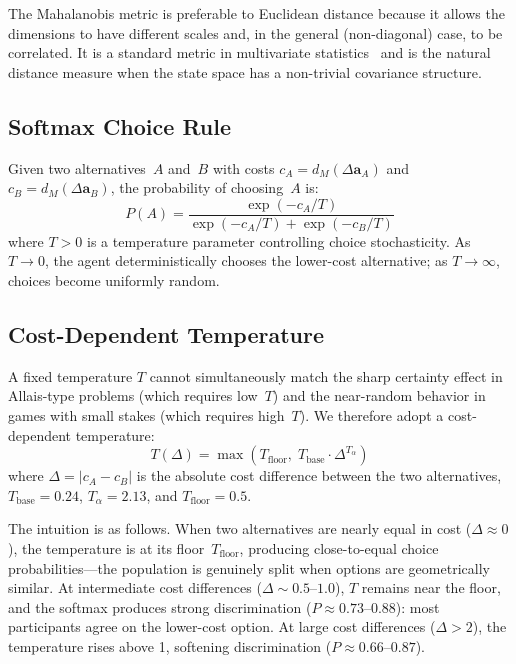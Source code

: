\documentclass[journal]{IEEEtran}
\begin{document}
The Mahalanobis metric is preferable to Euclidean distance because it allows the dimensions to have different scales and, in the general (non-diagonal) case, to be correlated.
It is a standard metric in multivariate statistics~\cite{mahalanobis1936} and is the natural distance measure when the state space has a non-trivial covariance structure.

\subsection{Softmax Choice Rule}

Given two alternatives~$A$ and~$B$ with costs $c_A = d_M(\Delta\mathbf{a}_A)$ and $c_B = d_M(\Delta\mathbf{a}_B)$, the probability of choosing~$A$ is:
\begin{equation}
    P(A) = \frac{\exp(-c_A / T)}{\exp(-c_A / T) + \exp(-c_B / T)}
    \label{eq:softmax}
\end{equation}
where $T > 0$ is a temperature parameter controlling choice stochasticity.
As $T \to 0$, the agent deterministically chooses the lower-cost alternative; as $T \to \infty$, choices become uniformly random.

\subsection{Cost-Dependent Temperature}

A fixed temperature $T$ cannot simultaneously match the sharp certainty effect in Allais-type problems (which requires low~$T$) and the near-random behavior in games with small stakes (which requires high~$T$).
We therefore adopt a cost-dependent temperature:
\begin{equation}
    T(\Delta) = \max\!\left(T_{\text{floor}},\; T_{\text{base}} \cdot \Delta^{T_\alpha}\right)
    \label{eq:temperature}
\end{equation}
where $\Delta = |c_A - c_B|$ is the absolute cost difference between the two alternatives, $T_{\text{base}} = 0.24$, $T_\alpha = 2.13$, and $T_{\text{floor}} = 0.5$.

The intuition is as follows.
When two alternatives are nearly equal in cost ($\Delta \approx 0$), the temperature is at its floor~$T_{\text{floor}}$, producing close-to-equal choice probabilities---the population is genuinely split when options are geometrically similar.
At intermediate cost differences ($\Delta \sim 0.5$--$1.0$), $T$ remains near the floor, and the softmax produces strong discrimination ($P \approx 0.73$--$0.88$): most participants agree on the lower-cost option.
At large cost differences ($\Delta > 2$), the temperature rises above 1, softening discrimination ($P \approx 0.66$--$0.87$).
\end{document}
